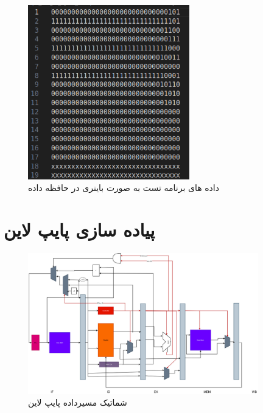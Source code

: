 \documentclass[11pt, a4paper]{article}
\begin{document}
	\begin{figure}[H]
		\begin{center}
			\includegraphics[width=7cm]{Photos/3.png}
		\end{center}
		\caption{داده های برنامه تست به صورت باینری در حافظه داده}
		\label{Data_Mem}
	\end{figure}
	
	
	\section{پیاده سازی پایپ لاین}
	
	\begin{figure}[H]
		\begin{center}
			\includegraphics[width=10cm]{Photos/Pipeline_Figure.jpg}
		\end{center}
		\caption{شماتیک مسیرداده پایپ لاین}
		\label{Pipeline_schamitic}
	\end{figure}
 
\end{document}
